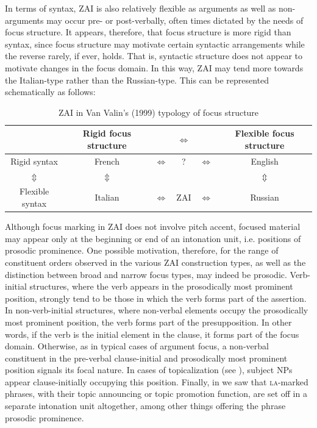 In terms of syntax, ZAI is also relatively flexible as arguments as well as non-arguments may occur pre- or post-verbally, often times dictated by the needs of focus structure. It appears, therefore, that focus structure is more rigid than syntax, since focus structure may motivate certain syntactic arrangements while the reverse rarely, if ever, holds. That is, syntactic structure does not appear to motivate changes in the focus domain. In this way, ZAI may tend more towards the Italian-type rather than the Russian-type. This can be represented schematically as follows:

\begin{table}[H]
\begin{center}
\caption{\small{ZAI in Van Valin's (1999) typology of focus structure}}\label{zapfoctyp}
\begin{tabular}{| c c c c c c |}\hline
& Rigid focus structure & & $\Leftrightarrow$ & & Flexible focus structure  \\
\hline
Rigid syntax & French & $\Leftrightarrow$ & ? & $\Leftrightarrow$ & English \\
$\Updownarrow$ &  $\Updownarrow$ & & & & $\Updownarrow$ \\
Flexible syntax & Italian & $\Leftrightarrow$ & ZAI & $\Leftrightarrow$ & Russian \\
\hline
\end{tabular}
\end{center}
\end{table}

Although focus marking in ZAI does not involve pitch accent, focused material may appear only at the beginning or end of an intonation unit, i.e. positions of prosodic prominence. One possible motivation, therefore, for the range of constituent orders observed in the various ZAI construction types, as well as the distinction between broad and narrow focus types, may indeed be prosodic. Verb-initial structures, where the verb appears in the prosodically most prominent position, strongly tend to be those in which the verb forms part of the assertion. In non-verb-initial structures, where non-verbal elements occupy the prosodically most prominent position, the verb forms part of the presupposition. In other words, if the verb is the initial element in the clause, it forms part of the focus domain. Otherwise, as in typical cases of argument focus, a non-verbal constituent in the pre-verbal clause-initial and prosodically most prominent position signals its focal nature. In cases of topicalization (see ), subject NPs appear clause-initially occupying this position. Finally, in  we saw that \textsc{la}-marked phrases, with their topic announcing or topic promotion function, are set off in a separate intonation unit altogether, among other things offering the phrase prosodic prominence. 



